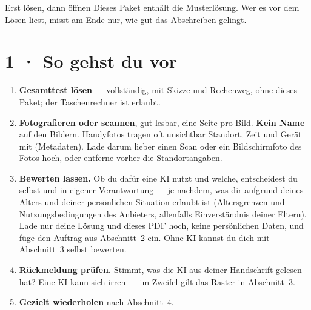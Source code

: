 \documentclass[11pt]{article}
\begin{document}

\begin{lpachtung}{Erst lösen, dann öffnen}
Dieses Paket enthält die Musterlösung. Wer es vor dem Lösen liest, misst am Ende nur, wie gut das Abschreiben gelingt.
\end{lpachtung}

\section*{1 · So gehst du vor}
\begin{enumerate}[leftmargin=*,itemsep=2pt]
\item \textbf{Gesamttest lösen} — vollständig, mit Skizze und Rechenweg, ohne dieses Paket; der Taschenrechner ist erlaubt.
\item \textbf{Fotografieren oder scannen}, gut lesbar, eine Seite pro Bild. \textbf{Kein Name} auf den Bildern.
  Handyfotos tragen oft unsichtbar Standort, Zeit und Gerät mit (Metadaten). Lade darum lieber einen Scan oder ein
  Bildschirmfoto des Fotos hoch, oder entferne vorher die Standortangaben.
\item \textbf{Bewerten lassen.} Ob du dafür eine KI nutzt und welche, entscheidest du selbst und in eigener Verantwortung —
  je nachdem, was dir aufgrund deines Alters und deiner persönlichen Situation erlaubt ist (Altersgrenzen und
  Nutzungsbedingungen des Anbieters, allenfalls Einverständnis deiner Eltern). Lade nur deine Lösung und dieses PDF hoch,
  keine persönlichen Daten, und füge den Auftrag aus Abschnitt~2 ein. Ohne KI kannst du dich mit Abschnitt~3 selbst bewerten.
\item \textbf{Rückmeldung prüfen.} Stimmt, was die KI aus deiner Handschrift gelesen hat? Eine KI kann sich irren —
  im Zweifel gilt das Raster in Abschnitt~3.
\item \textbf{Gezielt wiederholen} nach Abschnitt~4.
\end{enumerate}

\end{document}
